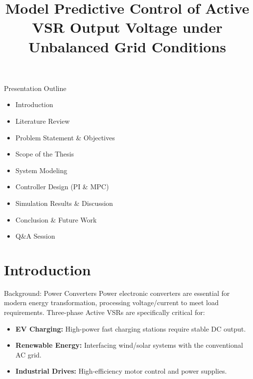 \documentclass[aspectratio=169]{beamer}
\title[MPC of Active VSR]{Model Predictive Control of Active VSR Output Voltage under Unbalanced Grid Conditions}
\begin{document}
\begin{frame}
    \titlepage
\end{frame}

\begin{frame}{Presentation Outline}
    \begin{itemize}
        \item[\checkmark] Introduction
        \item[\checkmark] Literature Review 
        \item[\checkmark] Problem Statement \& Objectives
        \item[\checkmark] Scope of the Thesis 
        \item[\checkmark] System Modeling
        \item[\checkmark] Controller Design (PI \& MPC)
        \item[\checkmark] Simulation Results \& Discussion
        \item[\checkmark] Conclusion \& Future Work
        \item[\checkmark] Q\&A Session
    \end{itemize}
\end{frame}

\section{Introduction}

\begin{frame}{Background: Power Converters}
    Power electronic converters are essential for modern energy transformation, processing voltage/current to meet load requirements. Three-phase Active VSRs are specifically critical for:
    \vspace{0.3cm}
    \begin{itemize}
        \item \textbf{EV Charging:} High-power fast charging stations require stable DC output.
        \item \textbf{Renewable Energy:} Interfacing wind/solar systems with the conventional AC grid.
        \item \textbf{Industrial Drives:} High-efficiency motor control and power supplies.
    \end{itemize}
\end{frame}
\end{document}

